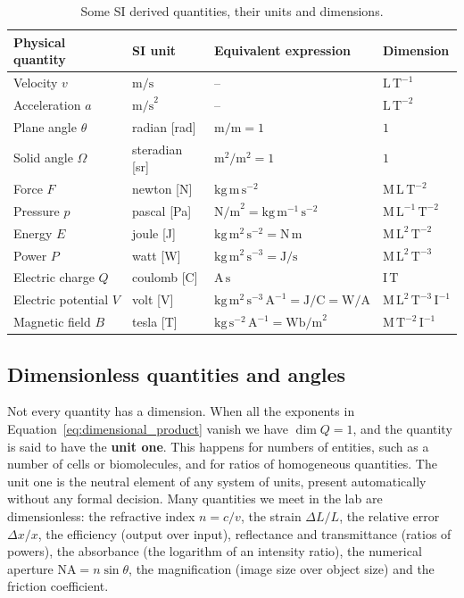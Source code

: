 \documentclass[letterpaper,11pt,leqno]{book}
\begin{document}
\begin{table}[h]
\centering
\caption{Some SI derived quantities, their units and dimensions.}
\label{tab:derived_units}
\begin{tabular*}{\textwidth}{l@{\extracolsep\fill}lll}
\toprule
Physical quantity & SI unit & Equivalent expression & Dimension \\
\midrule
Velocity $v$ & $\text{m/s}$ & -- & $\text{L}\,\text{T}^{-1}$ \\
Acceleration $a$ & $\text{m/s}^2$ & -- & $\text{L}\,\text{T}^{-2}$ \\
Plane angle $\theta$ & radian [rad] & $\text{m/m} = 1$ & $1$ \\
Solid angle $\Omega$ & steradian [sr] & $\text{m}^2/\text{m}^2 = 1$ & $1$ \\
Force $F$ & newton [N] & $\text{kg}\,\text{m}\,\text{s}^{-2}$ & $\text{M}\,\text{L}\,\text{T}^{-2}$ \\
Pressure $p$ & pascal [Pa] & $\text{N/m}^2 = \text{kg}\,\text{m}^{-1}\,\text{s}^{-2}$ & $\text{M}\,\text{L}^{-1}\,\text{T}^{-2}$ \\
Energy $E$ & joule [J] & $\text{kg}\,\text{m}^2\,\text{s}^{-2} = \text{N}\,\text{m}$ & $\text{M}\,\text{L}^2\,\text{T}^{-2}$ \\
Power $P$ & watt [W] & $\text{kg}\,\text{m}^2\,\text{s}^{-3} = \text{J/s}$ & $\text{M}\,\text{L}^2\,\text{T}^{-3}$ \\
Electric charge $Q$ & coulomb [C] & $\text{A}\,\text{s}$ & $\text{I}\,\text{T}$ \\
Electric potential $V$ & volt [V] & $\text{kg}\,\text{m}^2\,\text{s}^{-3}\,\text{A}^{-1} = \text{J/C} = \text{W/A}$ & $\text{M}\,\text{L}^2\,\text{T}^{-3}\,\text{I}^{-1}$ \\
Magnetic field $B$ & tesla [T] & $\text{kg}\,\text{s}^{-2}\,\text{A}^{-1} = \text{Wb/m}^2$ & $\text{M}\,\text{T}^{-2}\,\text{I}^{-1}$ \\
\bottomrule
\end{tabular*}
\end{table}

\subsection{Dimensionless quantities and angles}

Not every quantity has a dimension. When all the exponents in Equation~\eqref{eq:dimensional_product} vanish we have $\dim Q = 1$, and the quantity is said to have the \textbf{unit one}. This happens for numbers of entities, such as a number of cells or biomolecules, and for ratios of homogeneous quantities. The unit one is the neutral element of any system of units, present automatically without any formal decision. Many quantities we meet in the lab are dimensionless: the refractive index $n = c/v$, the strain $\Delta L/L$, the relative error $\Delta x/x$, the efficiency (output over input), reflectance and transmittance (ratios of powers), the absorbance (the logarithm of an intensity ratio), the numerical aperture $\text{NA} = n\sin\theta$, the magnification (image size over object size) and the friction coefficient.
\end{document}
